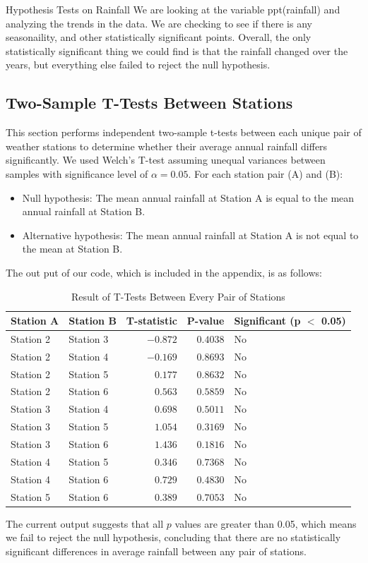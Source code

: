 \documentclass[12pt]{article}
\theoremstyle{definition}
\begin{document}
\begin{section}{Hypothesis Tests on Rainfall}
We are looking at the variable ppt(rainfall) and analyzing the trends in the data. We are checking to see if there is any seasonaility, and other statistically significant points. Overall, the only statistically significant thing we could find is that the rainfall changed over the years, but everything else failed to reject the null hypothesis.
\subsection{Two-Sample T-Tests Between Stations}
This section performs independent two-sample t-tests between each unique pair of weather stations to determine whether their average annual rainfall differs significantly. We used Welch's T-test assuming unequal variances between samples with significance level of $\alpha=0.05$. For each station pair (A) and (B):
\begin{itemize}
    \item Null hypothesis: The mean annual rainfall at Station A is equal to the mean annual rainfall at Station B.
    \item Alternative hypothesis: The mean annual rainfall at Station A is not equal to the mean at Station B.
\end{itemize}
The out put of our code, which is included in the appendix, is as follows:
\begin{table}[H]
\centering
\caption{Result of T-Tests Between Every Pair of Stations}
\label{tab:station_comparison}
\begin{tabular}{|l|l|r|r|l|}
\toprule
\textbf{Station A} & \textbf{Station B} & \textbf{T-statistic} & \textbf{P-value} & \textbf{Significant (p $<$ 0.05)} \\
\hline
Station 2 & Station 3 & $-0.872$ & $0.4038$ & No \\ \hline
Station 2 & Station 4 & $-0.169$ & $0.8693$ & No \\ \hline
Station 2 & Station 5 & $0.177$ & $0.8632$ & No \\ \hline
Station 2 & Station 6 & $0.563$ & $0.5859$ & No \\ \hline
Station 3 & Station 4 & $0.698$ & $0.5011$ & No \\ \hline
Station 3 & Station 5 & $1.054$ & $0.3169$ & No \\ \hline
Station 3 & Station 6 & $1.436$ & $0.1816$ & No \\ \hline
Station 4 & Station 5 & $0.346$ & $0.7368$ & No \\ \hline
Station 4 & Station 6 & $0.729$ & $0.4830$ & No \\ \hline
Station 5 & Station 6 & $0.389$ & $0.7053$ & No \\
\bottomrule
\end{tabular}
\end{table}
The current output suggests that all $p$ values are greater than 0.05, which means we fail to reject the null hypothesis, concluding that there are no statistically significant differences in average rainfall between any pair of stations.



\end{section}
\end{document}
